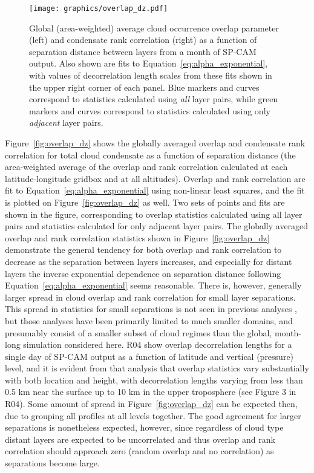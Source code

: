 \begin{figure}[tp]
\centering
\texttt{[image: graphics/overlap\_dz.pdf]}
\caption{\label{fig:overlap_dz}Global (area-weighted) average cloud
occurrence overlap parameter (left) and condensate rank correlation
(right) as a function of separation distance between layers from a month
of SP-CAM output. Also shown are fits to
Equation~\ref{eq:alpha_exponential}, with values of decorrelation length
scales from these fits shown in the upper right corner of each panel.
Blue markers and curves correspond to statistics calculated using
\emph{all} layer pairs, while green markers and curves correspond to
statistics calculated using only \emph{adjacent} layer
pairs.}\label{fig:overlapux5fdz}
\end{figure}

Figure~\ref{fig:overlap_dz} shows the globally averaged overlap and
condensate rank correlation for total cloud condensate as a function of
separation distance (the area-weighted average of the overlap and rank
correlation calculated at each latitude-longitude gridbox and at all
altitudes). Overlap and rank correlation are fit to
Equation~\ref{eq:alpha_exponential} using non-linear least squares, and
the fit is plotted on Figure~\ref{fig:overlap_dz} as well. Two sets of
points and fits are shown in the figure, corresponding to overlap
statistics calculated using all layer pairs and statistics calculated
for only adjacent layer pairs. The globally averaged overlap and rank
correlation statistics shown in Figure~\ref{fig:overlap_dz} demonstrate
the general tendency for both overlap and rank correlation to decrease
as the separation between layers increases, and especially for distant
layers the inverse exponential dependence on separation distance
following Equation~\ref{eq:alpha_exponential} seems reasonable. There
is, however, generally larger spread in cloud overlap and rank
correlation for small layer separations. This spread in statistics for
small separations is not seen in previous analyses
\citep[e.g.,][]{pincus_et_al_2005}, but those analyses have been
primarily limited to much smaller domains, and presumably consist of a
smaller subset of cloud regimes than the global, month-long simulation
considered here. R04 show overlap decorrelation lengths for a single day
of SP-CAM output as a function of latitude and vertical (pressure)
level, and it is evident from that analysis that overlap statistics vary
substantially with both location and height, with decorrelation lengths
varying from less than 0.5 km near the surface up to 10 km in the upper
troposphere (see Figure 3 in R04). Some amount of spread in
Figure~\ref{fig:overlap_dz} can be expected then, due to grouping all
profiles at all levels together. The good agreement for larger
separations is nonetheless expected, however, since regardless of cloud
type distant layers are expected to be uncorrelated and thus overlap and
rank correlation should approach zero (random overlap and no
correlation) as separations become large.

